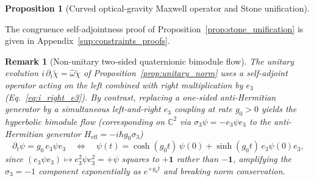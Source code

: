 \documentclass[aps,prd,onecolumn,tightenlines,nofootinbib,notitlepage,11pt,floatfix]{revtex4-2}
\theoremstyle{indentedtheorem}
\newtheorem{proposition}{Proposition}
\newtheorem{remark}{Remark}
\begin{document}
\begin{proposition}[Curved optical-gravity Maxwell operator and Stone unification]
\end{proposition}
\noindent The congruence self-adjointness proof of Proposition~\ref{prop:stone_unification} is given in Appendix~\ref{sup:constraints_proofs}.

\begin{remark}[Non-unitary two-sided quaternionic bimodule flow]
\label{rem:bimodule_flow}
The unitary evolution $i\,\partial_t\tilde{\chi} = \hat{\omega}\tilde{\chi}$ of Proposition~\ref{prop:unitary_norm} uses a self-adjoint operator acting on the left combined with right multiplication by $e_3$ (Eq.~\eqref{eq:i_right_e3}). By contrast, replacing a one-sided anti-Hermitian generator by a simultaneous left-and-right $e_3$ coupling at rate $g_0 > 0$ yields the hyperbolic bimodule flow (corresponding on $\mathbb{C}^2$ via $\sigma_3\psi = -e_3\psi e_3$ to the anti-Hermitian generator $H_\text{eff} = -i\hbar g_0\sigma_3$)
\begin{equation}
    \partial_t\psi = g_0\,e_3\psi e_3 \quad \Longleftrightarrow \quad \psi(t) = \cosh(g_0 t)\,\psi(0) + \sinh(g_0 t)\,e_3\psi(0)e_3 ,
    \label{eq:bimodule_flow}
\end{equation}
since $(e_3\psi e_3)\mapsto e_3^2\psi e_3^2 = +\psi$ squares to $+\mathbf{1}$ rather than $-\mathbf{1}$, amplifying the $\sigma_3=-1$ component exponentially as $e^{+g_0 t}$ and breaking norm conservation.
\end{remark}
\end{document}

